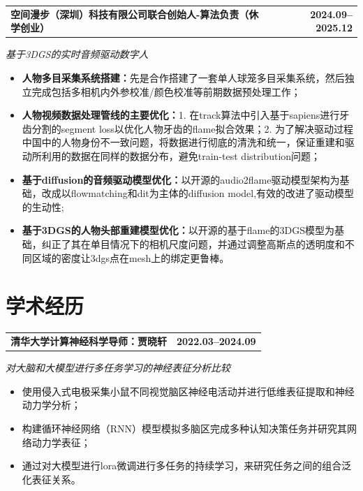 \documentclass[11pt,a4paper,UTF8,fontset=ubuntu]{ctexart}
\makeatletter
\newcommand{\cvitem}[2]{%
  \par\vspace{1em}
  \noindent
  \begin{tabularx}{\linewidth}{@{}X r@{}}%
    \textbf{#2} & \textbf{#1}\\%
  \end{tabularx}%
  \par\vspace{0.5em}
}
\newcommand{\cvsubitem}[1]{\par\vspace{0.25em}\noindent #1\\[-0.4em]}
\makeatother
\begin{document}
\cvitem{2024.09--2025.12}{空间漫步（深圳）科技有限公司\quad 联合创始人-算法负责（休学创业）}
\cvsubitem{\textit{基于3DGS的实时音频驱动数字人}}
\begin{itemize}
  \item \textbf{人物多目采集系统搭建：}先是合作搭建了一套单人球笼多目采集系统，然后独立完成包括多相机内外参校准/颜色校准等前期数据预处理工作；
  \item \textbf{人物视频数据处理管线的主要优化：}1. 在track算法中引入基于sapiens进行牙齿分割的segment loss以优化人物牙齿的flame拟合效果；2. 为了解决驱动过程中国中的人物身份不一致问题，将数据进行彻底的清洗和统一，保证重建和驱动所利用的数据在同样的数据分布，避免train-test distribution问题；
  \item \textbf{基于diffusion的音频驱动模型优化：}以开源的audio2flame驱动模型架构为基础，改成以flowmatching和dit为主体的diffusion model,有效的改进了驱动模型的生动性;
  \item \textbf{基于3DGS的人物头部重建模型优化：}以开源的基于flame的3DGS模型为基础，纠正了其在单目情况下的相机尺度问题，并通过调整高斯点的透明度和不同区域的密度让3dgs点在mesh上的绑定更鲁棒。
\end{itemize}

\section*{学术经历}
\cvitem{2022.03--2024.09}{清华大学\quad 计算神经科学\quad 导师：贾晓轩}
\cvsubitem{\textit{对大脑和大模型进行多任务学习的神经表征分析比较}}
\begin{itemize}
  \item 使用侵入式电极采集小鼠不同视觉脑区神经电活动并进行低维表征提取和神经动力学分析；
  \item 构建循环神经网络（RNN）模型模拟多脑区完成多种认知决策任务并研究其网络动力学表征；
  \item 通过对大模型进行lora微调进行多任务的持续学习，来研究任务之间的组合泛化表征关系。
\end{itemize}
\end{document}
